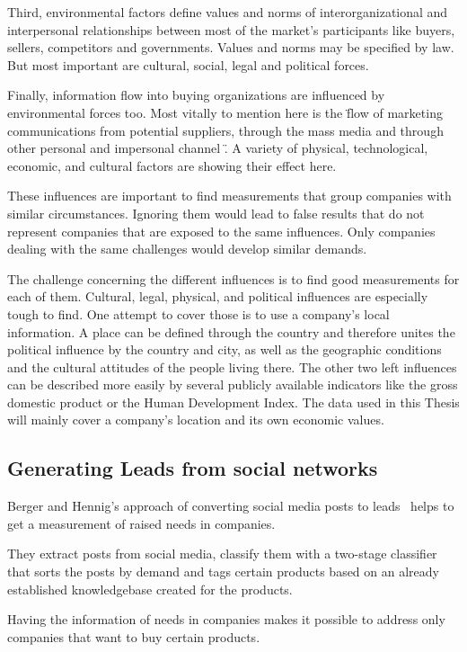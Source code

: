 Third, environmental factors define values and norms of interorganizational and interpersonal relationships between
most of the market's participants like buyers, sellers, competitors and governments. Values and norms may be
specified by law. But most important are cultural, social, legal and political forces.

Finally, information flow into buying organizations are influenced by environmental forces too. Most vitally
to mention here is the \"flow of marketing communications from potential suppliers, through the mass media and
through other personal and impersonal channel \". A variety of physical, technological, economic, and cultural
factors are showing their effect here.

These influences are important to find measurements that group companies with similar circumstances. Ignoring
them would lead to false results that do not represent companies that are exposed to the same influences. Only companies
dealing with the same challenges would develop similar demands.

The challenge concerning the different influences is to find good measurements for each of them. Cultural, legal, physical,
and political influences are especially tough to find. One attempt to cover those is to use a company's local information.
A place can be defined through the country and therefore unites the political influence by the country and city, as well as
the geographic conditions and the cultural attitudes of the people living there. The other two left influences can
be described more easily by several publicly available indicators like the gross domestic product or the Human Development
Index. The data used in this Thesis will mainly cover a company's location and its own economic values.

\subsection{Generating Leads from social networks}
Berger and Hennig's approach of converting social media posts to leads~\cite{n2o} helps to get a measurement of
raised needs in companies.

They extract posts from social media, classify them with a two-stage classifier that sorts the posts by demand and
tags certain products based on an already established knowledgebase created for the products.

Having the information of needs in companies makes it possible to address only companies that want to buy certain
products.

